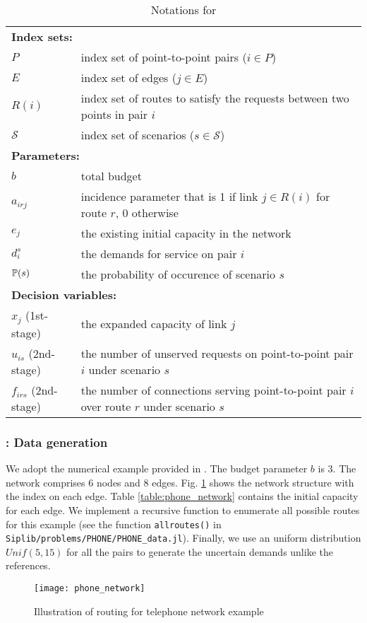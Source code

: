 \begin{table}[H]
	\caption{Notations for \phone}
	\label{phone:notation}
	\resizebox{\textwidth}{!}
	{
		\begin{tabular}{ll}
			\toprule
			\multicolumn{2}{l}{\textbf{Index sets:}} \\
			$P$ & index set of point-to-point pairs ($i\in P$) \\ 
			$E$ & index set of edges ($j\in E$) \\ 
			$R(i)$ & index set of routes to satisfy the requests between two points in pair $i$\\ 
			$\mathcal{S}$ & index set of scenarios ($s\in \mathcal{S}$)\\ \midrule
			\multicolumn{2}{l}{\textbf{Parameters:}} \\
			$b$ & total budget \\
			$a_{irj}$ & incidence parameter that is 1 if link $j\in R(i)$ for route $r$, 0 otherwise \\ 
			$e_j$ & the existing initial capacity in the network \\ 
			$d_{i}^s$ & the demands for service on pair $i$\\
			$\operatorname*{\mathbb{P}}(s)$ & \textrm{the probability of occurence of scenario $s$} \\  \midrule
			\multicolumn{2}{l}{\textbf{Decision variables:}} \\
			$x_j$ (1st-stage) & the expanded capacity of link $j$\\
			$u_{is}$ (2nd-stage) & the number of unserved requests on point-to-point pair $i$ under scenario $s$\\  
			$f_{irs}$ (2nd-stage) & the number of connections serving point-to-point pair $i$ over route $r$ under scenario $s$\\ 
			\bottomrule
		\end{tabular}
	}
\end{table} 

\subsubsection{\phone: Data generation}
We adopt the numerical example provided in \cite{journal:AF2004}. The budget parameter $b$ is 3. The network comprises 6 nodes and 8 edges. Fig. \ref{fig:phone_network} shows the network structure with the index on each edge. Table \ref{table:phone_network} contains the initial capacity for each edge. We implement a recursive function to enumerate all possible routes for this example (see the function \texttt{allroutes()} in \texttt{Siplib/problems/PHONE/PHONE\_data.jl}). Finally, we use an uniform distribution $Unif(5,15)$ for all the pairs to generate the uncertain demands unlike the references.
\begin{figure}[H]
	\centering
	\texttt{[image: phone\_network]}
	\caption{Illustration of routing for telephone network example \cite{journal:AF2004}} 
	\label{fig:phone_network}
\end{figure}

